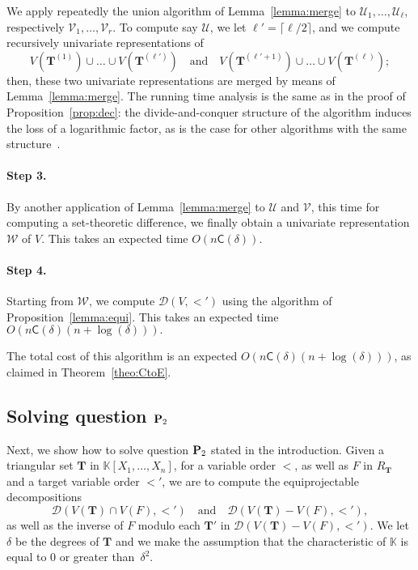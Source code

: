 \documentclass[12pt]{article}
\def\CC {\ensuremath{\mathsf{C}}}
\def\K {\ensuremath{\mathbb{K}}}
\def\Tt {\ensuremath{\mathbf{T}}}
\def\Ur {\ensuremath{\mathscr U}}
\def\Wr {\ensuremath{\mathscr W}}
\def\Vr {\ensuremath{\mathscr V}}
\def\Dr {\ensuremath{\mathscr D}}
\begin{document}
We apply repeatedly the union algorithm of Lemma~\ref{lemma:merge} to
$\Ur_1,\dots,\Ur_\ell$, respectively $\Vr_1,\dots,\Vr_r$. To compute
say $\Ur$, we let $\ell'=\lceil \ell/2\rceil$, and we compute
recursively univariate representations of
$$V(\Tt^{(1)}) \cup \dots \cup V(\Tt^{(\ell')}) \quad\text{and}\quad
V(\Tt^{(\ell'+1)}) \cup \dots \cup V(\Tt^{(\ell)});$$ then, these two
univariate representations are merged by means of
Lemma~\ref{lemma:merge}. The running time analysis is the same as in
the proof of Proposition~\ref{prop:dec}: the divide-and-conquer
structure of the algorithm induces the loss of a logarithmic factor,
as is the case for other algorithms with the same
structure~\cite[Chapter~10]{GaGe03}.

\paragraph{Step 3.} By another application of Lemma~\ref{lemma:merge}
to $\Ur$ and $\Vr$, this time for computing a set-theoretic
difference, we finally obtain a univariate representation $\Wr$ of
$V$. This takes an expected time $O(n\CC(\delta))$.

\paragraph{Step 4.} Starting from $\Wr$, we compute $\Dr(V,<')$ using
the algorithm of Proposition~\ref{lemma:equi}.  This takes an expected
time $O(n \CC(\delta)(n+\log(\delta))).$

\medskip

The total cost of this algorithm is an expected $O(n
\CC(\delta)(n+\log(\delta)))$, as claimed in Theorem~\ref{theo:CtoE}.



\subsection{Solving question ${\bf P}_2$}\label{ssec:P2}

Next, we show how to solve question ${\bf P}_2$ stated in the
introduction. Given a triangular set $\Tt$ in $\K[X_1,\dots,X_n]$, for
a variable order $<$, as well as $F$ in $R_\Tt$ and a target variable
order $<'$, we are to compute the equiprojectable decompositions
$$\Dr(V(\Tt)\cap V(F),<') \quad\text{and}\quad \Dr(V(\Tt)- V(F),<'),$$
as well as the inverse of $F$ modulo each $\Tt'$ in $\Dr(V(\Tt)-
V(F),<')$. We let $\delta$ be the degrees of $\Tt$ and we make the
assumption that the characteristic of $\K$ is equal to $0$ or greater
than~$\delta^2$.
\end{document}
